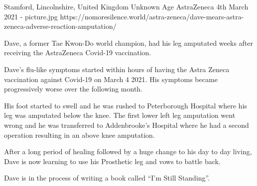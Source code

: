{Stamford, Lincolnshire, United Kingdom}
{Unknown Age}
{AstraZeneca}
{4th March 2021}
{-}
{picture.jpg}
{https://nomoresilence.world/astra-zeneca/dave-mears-astra-zeneca-adverse-reaction-amputation/}
{


Dave, a former Tae Kwon-Do world champion, had his leg amputated weeks after receiving the AstraZeneca Covid-19 vaccination.

Dave’s flu-like symptoms started within hours of having the Astra Zeneca vaccination against Covid-19 on March 4 2021. His symptoms became progressively worse over the following month.

His foot started to swell and he was rushed to Peterborough Hospital where his leg was amputated below the knee. The first lower left leg amputation went wrong and he was transferred to Addenbrooke’s Hospital where he had a second operation resulting in an above knee amputation.

After a long period of healing followed by a huge change to his day to day living, Dave is now learning to use his Prosthetic leg and vows to battle back.

Dave is in the process of writing a book called “I’m Still Standing”.
}
